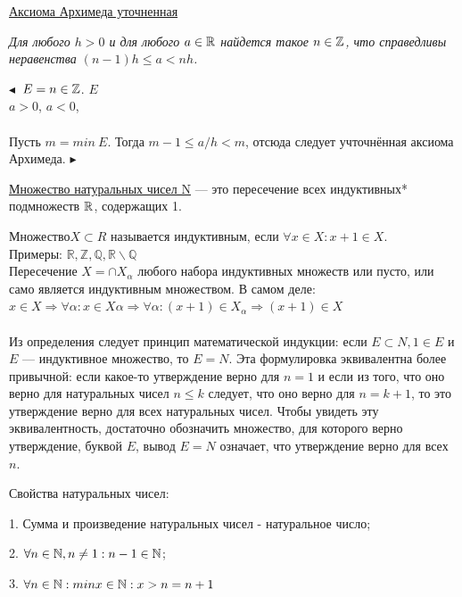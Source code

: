 \underline{Аксиома Архимеда уточненная}

\textit{Для любого $h > 0$ и для любого $a \in \mathbb{R}$ найдется такое $n \in \mathbb{Z}$, что справедливы неравенства $(n - 1)h \leq a < nh$.}

$\blacktriangleleft$ 
  $\: E = {n \in \mathbb{Z}}$.
 $E$  \\
$a > 0$, 
 $a < 0$,\\ \\
Пусть $m = min \: E$. Тогда $m - 1 \leq a/h < m$, отсюда следует учточнённая аксиома Архимеда. $\blacktriangleright$




\underline{Множество натуральных чисел N} — это пересечение всех индуктивных*
 подмножеств $\mathbb{R}$, содержащих 1.

Множество$  X \subset R $ называется индуктивным, если $ \forall x \in X : x + 1 \in X $.\\
Примеры: $ \mathbb{R},\mathbb{Z}, \mathbb{Q}, \mathbb{R}
 \backslash \mathbb{Q}$\\
Пересечение $ X = \cap X_{\alpha} $ любого
 набора индуктивных множеств или пусто, или само является
индуктивным множеством. В самом деле: $ x \in X \Rightarrow \forall \alpha : x \in X\alpha\Rightarrow \forall \alpha : (x+1) \in X_{\alpha} \Rightarrow (x+1) \in  X $
\\\\
 Из определения следует принцип математической индукции: если $ E \subset N, 1 \in E $ и $ E $ —
 индуктивное множество, то $ E = N $.
 Эта формулировка эквивалентна более привычной: если какое-то утверждение верно для
 $ n = 1 $ и если из того, что оно верно для натуральных чисел $ n \leqslant k $ следует, что оно верно для
 $ n = k + 1 $, то это утверждение верно для всех натуральных чисел.
 Чтобы увидеть эту эквивалентность, достаточно обозначить множество, для которого верно
 утверждение, буквой $  E $, вывод $ E = N $ означает, что утверждение верно для всех $  n $.
 
 Свойства натуральных чисел:
 
 1. Сумма и произведение натуральных чисел - натуральное число;
 
 2. $\forall n \in \mathbb{N}, n \neq 1: n - 1 \in \mathbb{N}$;
 
 3. $\forall n \in \mathbb{N}: min{x \in \mathbb{N}: x > n} = n + 1$
 
